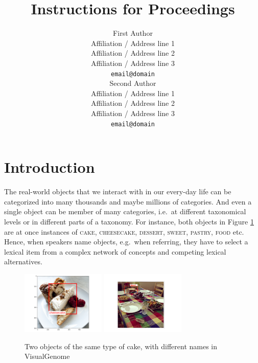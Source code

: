 \documentclass[11pt,a4paper]{article}
\title{Instructions for \confname{} Proceedings}
\author{First Author \\
  Affiliation / Address line 1 \\
  Affiliation / Address line 2 \\
  Affiliation / Address line 3 \\
  {\tt email@domain} \\\And
  Second Author \\
  Affiliation / Address line 1 \\
  Affiliation / Address line 2 \\
  Affiliation / Address line 3 \\
  {\tt email@domain} \\}
\date{}
\begin{document}
\maketitle
\begin{abstract}
\end{abstract}


\newcommand{\refexp}[1]{\textsl{#1}}
\newcommand{\word}[1]{\textsl{#1}}
\newcommand{\cat}[1]{\textsc{#1}}
\newcommand{\vgenome}{VisualGenome\xspace}
\newcommand{\ra}{$\rightarrow$}

\newcommand{\sz}[1]{\textcolor{blue}{\emph{//sz: #1//}}}


\section{Introduction}

The real-world objects that we interact with in our every-day life can be categorized into many thousands and maybe millions of categories. And even a single object can be member of many categories, i.e.\ at different taxonomical levels or in different parts of a taxonomy. For instance, both objects in Figure \ref{fig:cake} are at once instances of \cat{cake}, \cat{cheesecake}, \cat{dessert}, \cat{sweet}, \cat{pastry}, \cat{food} etc. Hence, when speakers name objects, e.g.\ when referring, they have to select a lexical item from a complex network of concepts and competing lexical alternatives.


\begin{figure}[htbp]
\begin{center}
\includegraphics[height=3cm]{Figures/cheescake.png}
\includegraphics[height=3cm]{Figures/cheesecak2.pdf}
\caption{Two objects of the same type of cake, with different names in VisualGenome}
\label{fig:cake}
\end{center}
\end{figure}
\end{document}

